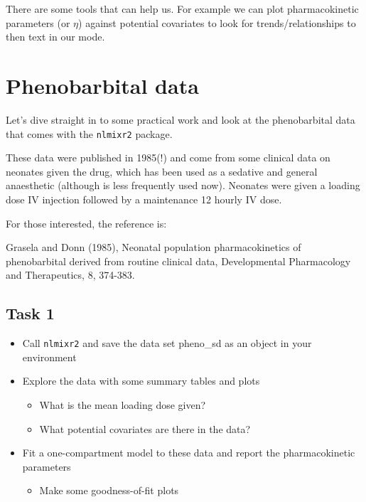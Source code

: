 \documentclass[
]{article}
\providecommand{\tightlist}{%
  \setlength{\itemsep}{0pt}\setlength{\parskip}{0pt}}
\begin{document}
There are some tools that can help us. For example we can plot pharmacokinetic parameters (or \(\eta\)) against potential covariates to look for trends/relationships to then text in our mode.

\section{Phenobarbital data}\label{phenobarbital-data}

Let's dive straight in to some practical work and look at the phenobarbital data that comes with the \texttt{nlmixr2} package.

These data were published in 1985(!) and come from some clinical data on neonates given the drug, which has been used as a sedative and general anaesthetic (although is less frequently used now). Neonates were given a loading dose IV injection followed by a maintenance 12 hourly IV dose.

For those interested, the reference is:

Grasela and Donn (1985), Neonatal population pharmacokinetics of phenobarbital derived from routine clinical data, Developmental Pharmacology and Therapeutics, 8, 374-383.

\subsection{Task 1}\label{task-1}

\begin{itemize}
\tightlist
\item
  Call \texttt{nlmixr2} and save the data set pheno\_sd as an object in your environment
\item
  Explore the data with some summary tables and plots

  \begin{itemize}
  \tightlist
  \item
    What is the mean loading dose given?
  \item
    What potential covariates are there in the data?
  \end{itemize}
\item
  Fit a one-compartment model to these data and report the pharmacokinetic parameters

  \begin{itemize}
  \tightlist
  \item
    Make some goodness-of-fit plots
  \end{itemize}
\end{itemize}
\end{document}
